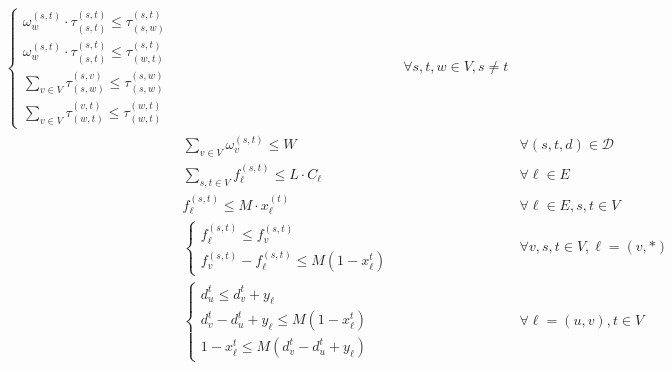 \documentclass[a4paper,USenglish]{lipics-v2018}
\begin{document}
\begin{align}
\begin{cases*}
  \omega^{(s,t)}_{w} \cdot \tau^{(s,t)}_{(s,t)} \leq \tau^{(s,t)}_{(s,w)}	\\
 \omega^{(s,t)}_{w}  \cdot \tau^{(s,t)}_{(s,t)} \leq  \tau^{(s,t)}_{(w,t)}\\
 \sum_{ v\in V} \tau^{(s,v)}_{(s,w)} \leq \tau^{(s,w)}_{(s,w)} \\
   \sum_{ v\in V} \tau^{(v,t)}_{(w,t)} \leq  \tau^{(w,t)}_{(w,t)} 
 \end{cases*}
 && \forall s,t,w \in V, s\neq t
 \\
 &\sum_{v \in V}  \omega^{(s,t)}_v \leq W
 && \forall (s,t,d) \in \mathcal{D}
 \label{LP:wp_limit} 
 \\
 & \sum_{ s,t \in V} f^{(s,t)}_{\ell} \leq L \cdot C_{\ell}
 && \forall \ell \in E
 \\
&   f^{(s,t)}_{\ell} \leq M \cdot x^{(t)}_{\ell}
&& \forall \ell \in E, s,t \in V
 \label{LP:SPTree} 
 \\
&
\begin{cases*}
	f^{(s,t)}_{\ell} \leq f^{(s,t)}_{v}	\\
	f^{(s,t)}_{v} - f^{(s,t)}_{\ell} \leq M(1 - x^{t}_{\ell}) 
\end{cases*}	
&& \forall v,s,t \in V, \ell = (v,*)
 \label{LP:equalSplit} 
\\ 
&\begin{cases*}
	d^{t}_u \leq d^{t}_v + y_{\ell} \\
	d^{t}_v - d^{t}_u + y_{\ell} \leq M(1 - x^t_{\ell})	\\
	1 - x^t_{\ell} \leq M(d^{t}_v - d^{t}_u + y_{\ell})
\end{cases*}
&& \forall \ell = (u,v),  t \in V
 \label{LP:weights} 
\end{align}
\end{document}
